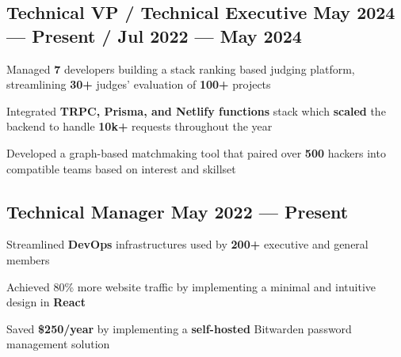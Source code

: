 \subsection{{Technical VP / Technical Executive \hfill May 2024 --- Present / Jul 2022 --- May 2024}}
\begin{zitemize}
    \item Managed \textbf{7} developers building a stack ranking based judging platform, streamlining \textbf{30+} judges' evaluation of \textbf{100+} projects
    \item Integrated \textbf{TRPC, Prisma, and Netlify functions} stack which \textbf{scaled} the backend to handle \textbf{10k+} requests throughout the year
    \item Developed a graph-based matchmaking tool that paired over \textbf{500} hackers into compatible teams based on interest and skillset
\end{zitemize}

\vspace{0.3cm}\subsection{{Technical Manager  \hfill May 2022 --- Present}}
\begin{zitemize}
    \item Streamlined \textbf{DevOps} infrastructures used by \textbf{200+} executive and general members
    \item Achieved 80\% more website traffic by implementing a minimal and intuitive design in \textbf{React}
    \item Saved \textbf{\$250/year} by implementing a \textbf{self-hosted} Bitwarden password management solution

\end{zitemize}